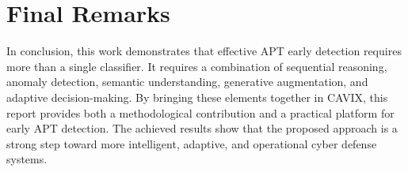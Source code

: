 \section{Final Remarks}

In conclusion, this work demonstrates that effective APT early detection requires more than a single classifier. It requires a combination of sequential reasoning, anomaly detection, semantic understanding, generative augmentation, and adaptive decision-making. By bringing these elements together in CAVIX, this report provides both a methodological contribution and a practical platform for early APT detection. The achieved results show that the proposed approach is a strong step toward more intelligent, adaptive, and operational cyber defense systems.